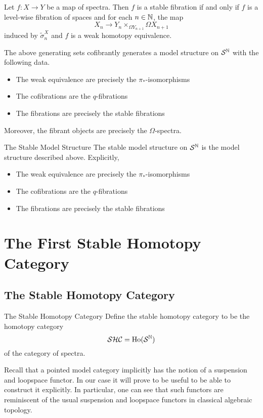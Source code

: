 \documentclass[a4paper]{article}
\begin{document}
\begin{prp}{}{} Let $f:X\to Y$ be a map of spectra. Then $f$ is a stable fibration if and only if $f$ is a level-wise fibration of spaces and for each $n\in\mathbb{N}$, the map $$X_n\to Y_n\times_{\Omega Y_{n+1}}\Omega X_{n+1}$$ induced by $\widetilde{\sigma}_n^X$ and $f$ is a weak homotopy equivalence. 
\end{prp}

\begin{thm}{}{} The above generating sets cofibrantly generates a model structure on $\mathcal{S}^{\mathbb{N}}$ with the following data. 
\begin{itemize}
\item The weak equivalence are precisely the $\pi_\ast$-isomorphisms
\item The cofibrations are the $q$-fibrations
\item The fibrations are precisely the stable fibrations
\end{itemize}
Moreover, the fibrant objects are precisely the $\Omega$-spectra. 
\end{thm}

\begin{defn}{The Stable Model Structure}{} The stable model structure on $\mathcal{S}^{\mathbb{N}}$ is the model structure described above. Explicitly, 
\begin{itemize}
\item The weak equivalence are precisely the $\pi_\ast$-isomorphisms
\item The cofibrations are the $q$-fibrations
\item The fibrations are precisely the stable fibrations
\end{itemize}
\end{defn}

\pagebreak
\section{The First Stable Homotopy Category}
\subsection{The Stable Homotopy Category}
\begin{defn}{The Stable Homotopy Category}{} Define the stable homotopy category to be the homotopy category $$\mathcal{S}\mathcal{H}\mathcal{C}=\text{Ho}(\mathcal{S}^{\mathbb{N}})$$ of the category of spectra. 
\end{defn}

Recall that a pointed model category implicitly has the notion of a suspension and loopspace functor. In our case it will prove to be useful to be able to construct it explicitly. In particular, one can see that such functors are reminiscent of the usual suspension and loopspace functors in classical algebraic topology. 
\end{document}
